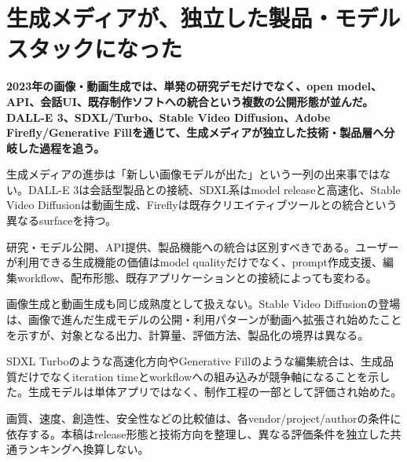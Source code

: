 \section{生成メディアが、独立した製品・モデルスタックになった}
\noindent\textbf{2023年の画像・動画生成では、単発の研究デモだけでなく、open model、API、会話UI、既存制作ソフトへの統合という複数の公開形態が並んだ。DALL-E 3、SDXL/Turbo、Stable Video Diffusion、Adobe Firefly/Generative Fillを通じて、生成メディアが独立した技術・製品層へ分岐した過程を追う。}\autocite{src-091bbe9dbf4e,src-096341c0ccf6,src-0b410c70bfc7,src-18f22707bf78,src-2b694ab9a461,src-2c97fc5583a3,src-317afaba6510,src-9bc8e7751f80,src-9da0d929aa45,src-a4f61fbe35c5,src-ba80e5e27a11,src-e79065444906}

生成メディアの進歩は「新しい画像モデルが出た」という一列の出来事ではない。DALL-E 3は会話型製品との接続、SDXL系はmodel releaseと高速化、Stable Video Diffusionは動画生成、Fireflyは既存クリエイティブツールとの統合という異なるsurfaceを持つ。\autocite{src-091bbe9dbf4e,src-096341c0ccf6,src-0b410c70bfc7,src-18f22707bf78,src-2b694ab9a461,src-2c97fc5583a3,src-317afaba6510,src-9bc8e7751f80,src-9da0d929aa45,src-a4f61fbe35c5,src-ba80e5e27a11,src-e79065444906}


研究・モデル公開、API提供、製品機能への統合は区別すべきである。ユーザーが利用できる生成機能の価値はmodel qualityだけでなく、prompt作成支援、編集workflow、配布形態、既存アプリケーションとの接続によっても変わる。\autocite{src-091bbe9dbf4e,src-18f22707bf78,src-2b694ab9a461,src-317afaba6510,src-9bc8e7751f80,src-9da0d929aa45,src-a4f61fbe35c5,src-ba80e5e27a11,src-e79065444906}


画像生成と動画生成も同じ成熟度として扱えない。Stable Video Diffusionの登場は、画像で進んだ生成モデルの公開・利用パターンが動画へ拡張され始めたことを示すが、対象となる出力、計算量、評価方法、製品化の境界は異なる。\autocite{src-091bbe9dbf4e,src-096341c0ccf6,src-0b410c70bfc7,src-18f22707bf78,src-2c97fc5583a3,src-317afaba6510,src-9da0d929aa45,src-e79065444906}


SDXL Turboのような高速化方向やGenerative Fillのような編集統合は、生成品質だけでなくiteration timeとworkflowへの組み込みが競争軸になることを示した。生成モデルは単体アプリではなく、制作工程の一部として評価され始めた。\autocite{src-091bbe9dbf4e,src-18f22707bf78,src-2b694ab9a461,src-317afaba6510,src-9da0d929aa45,src-a4f61fbe35c5,src-e79065444906}


\begin{claimboundary}
画質、速度、創造性、安全性などの比較値は、各vendor/project/authorの条件に依存する。本稿はrelease形態と技術方向を整理し、異なる評価条件を独立した共通ランキングへ換算しない。\autocite{src-9bc8e7751f80,src-ba80e5e27a11}
\end{claimboundary}
